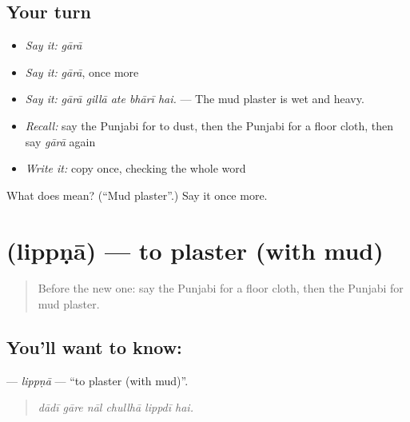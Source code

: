 \subsection*{Your turn}
\begin{itemize}
\raggedright
  \item \emph{Say it:} \emph{gārā}
  \item \emph{Say it:} \emph{gārā}, once more
  \item \emph{Say it:} \emph{gārā gillā ate bhārī hai.} — The mud plaster is wet and heavy.
  \item \emph{Recall:} say the Punjabi for to dust, then the Punjabi for a floor cloth, then say \emph{gārā} again
  \item \emph{Write it:} copy \textbf{} once, checking the whole word
\end{itemize}

\begin{tcolorbox}[breakable,colback=teal!4,colframe=teal!35!black,title={Before you move on}]
What does  mean? (\textquotedblleft{}Mud plaster\textquotedblright{}.) Say it once more.
\end{tcolorbox}
\section[\texorpdfstring{\pa{ਲਿੱਪਣਾ} (lippṇā)}{ਲਿੱਪਣਾ (lippṇā)}]{ (lippṇā) — to plaster (with mud)}

\label{lesson:PA-C235-lippna}



\begin{quote}
Before the new one: say the Punjabi for a floor cloth, then the Punjabi for mud plaster.
\end{quote}

\subsection*{You'll want to know: }
\textbf{} — \emph{lippṇā} — \textquotedblleft{}to plaster (with mud)\textquotedblright{}.

\begin{quote}
     
\end{quote}

\begin{quote}
\emph{dādī gāre nāl chullhā lippdī hai.}
\end{quote}

